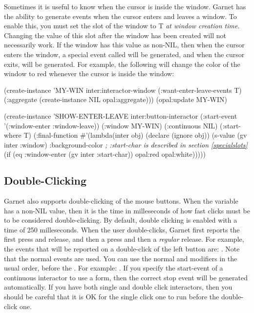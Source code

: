 Sometimes it is useful to know when the cursor is inside the window.
Garnet has the ability to generate events when the cursor enters and
leaves a window.  To enable this, you must set the
 slot of the window to T {\it at window
creation time}.  Changing the value of this slot after the window has
been created will not necessarily work.  If the window has this value as
non-NIL, then when the cursor enters the window, a special event
called  will be generated, and when the cursor
exits,  will be generated.  For example, the
following will change the color of the window to red whenever the
cursor is inside the window:

\begin{programexample}
(create-instance 'MY-WIN inter:interactor-window
  (:want-enter-leave-events T)
  (:aggregate (create-instance NIL opal:aggregate)))
(opal:update MY-WIN)

(create-instance 'SHOW-ENTER-LEAVE inter:button-interactor
  (:start-event '(:window-enter :window-leave))
  (:window MY-WIN)
  (:continuous NIL)
  (:start-where T)
  (:final-function \#'(lambda(inter obj)
		       (declare (ignore obj))
		       (s-value (gv inter :window)
				:background-color
                                {\it ; :start-char is described in section \ref{specialslots}}
				(if (eq :window-enter (gv inter :start-char))
				    opal:red
				    opal:white)))))
\end{programexample}


\subsection{Double-Clicking}
Garnet also supports double-clicking of the mouse buttons.  When the
variable  has a non-NIL value, then it
is the time in milleseconds of how fast clicks must be to be
considered double-clicking.  By default, double clicking is enabled
with a time of 250 milleseconds.
When the user double-clicks, Garnet first reports the first press and
release, and then a  press and then a {\it regular} release.
For example, the events that will be reported on a double-click of the
left button are: .
Note that the normal  events are used.  You can use the normal
 and  modifiers in the usual order,
before the .  For example: .
If you specify the start-event of a continuous interactor to use a
 form, then the correct stop event will be generated
automatically.  If you have both single and double click interactors,
then you should be careful that it is OK for the single click one to
run before the double-click one.

